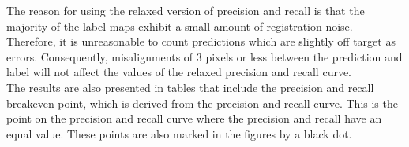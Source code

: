 The reason for using the relaxed version of precision and recall is that the majority of the label maps exhibit a small amount of registration noise. Therefore, it is unreasonable to count predictions which are slightly off target as errors. Consequently, misalignments of 3 pixels or less between the prediction and label will not affect the values of the relaxed precision and recall curve.\\

The results are also presented in tables that include the precision and recall breakeven point, which is derived from the precision and recall curve. This is the point on the precision and recall curve where the precision and recall have an equal value. These points are also marked in the figures by a black dot.\\



